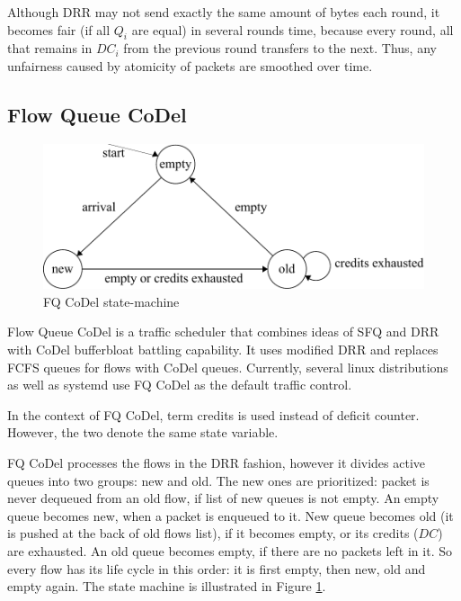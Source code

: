 Although DRR may not send exactly the same amount of bytes each round, it becomes fair (if all $Q_i$ are equal) in several rounds time, because every round, all that remains in $DC_i$ from the previous round transfers to the next. Thus, any unfairness caused by atomicity of packets are smoothed over time.


\subsection{Flow Queue CoDel}

\begin{figure}
	\centering
	\includegraphics[width=137mm]{drawings/fq_codel}
	\caption{FQ CoDel state-machine}
	
	\label{fig06:fqcodel}
\end{figure}

Flow Queue CoDel \cite{fq_codel} is a traffic scheduler that combines ideas of SFQ and DRR with CoDel bufferbloat battling capability. It uses modified DRR and replaces FCFS queues for flows with CoDel queues. Currently, several linux distributions as well as systemd use FQ CoDel as the default traffic control.

In the context of FQ CoDel, term credits is used instead of deficit counter. However, the two denote the same state variable.

FQ CoDel processes the flows in the DRR fashion, however it divides active queues into two groups: new and old. The new ones are prioritized: packet is never dequeued from an old flow, if list of new queues is not empty. An empty queue becomes new, when a packet is enqueued to it. New queue becomes old (it is pushed at the back of old flows list), if it becomes empty, or its credits ($DC$) are exhausted. An old queue becomes empty, if there are no packets left in it. So every flow has its life cycle in this order: it is first empty, then new, old and empty again. The state machine is illustrated in Figure \ref{fig06:fqcodel}.

